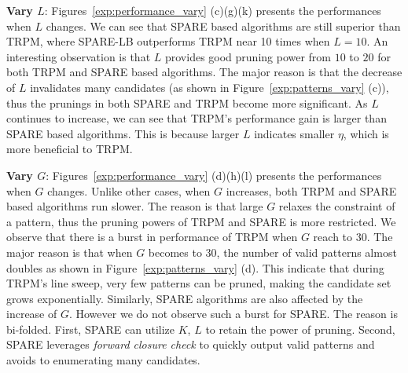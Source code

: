\textbf{Vary $L$}: Figures~\ref{exp:performance_vary} (c)(g)(k) presents the performances when $L$ changes. We can see that SPARE based algorithms are still superior than TRPM, where SPARE-LB outperforms TRPM near 10 times when $L =10$.
An interesting observation is that $L$
provides good pruning power from $10$ to $20$ for both TRPM and SPARE based algorithms. The major reason is that the decrease of $L$ invalidates many candidates (as shown in Figure~\ref{exp:patterns_vary} (c)), thus the prunings in both SPARE and TRPM become more significant.  As $L$ continues to increase, we can see that TRPM's performance gain is larger than SPARE based algorithms. This is because larger $L$ indicates smaller $\eta$, which is more beneficial to TRPM.

\textbf{Vary $G$}: Figures~\ref{exp:performance_vary} (d)(h)(l) presents the performances when $G$ changes.  Unlike other cases, when $G$ increases, both TRPM and SPARE based algorithms run slower. The reason is that large $G$ relaxes the constraint of a pattern, thus the pruning powers of TRPM and SPARE is more restricted. We observe that there is a burst in performance of TRPM when $G$ reach to $30$. The major reason is that when $G$ becomes to 30, the number of valid patterns almost doubles as shown in Figure~\ref{exp:patterns_vary} (d). This indicate that during TRPM's line sweep, very few patterns can be pruned, making the candidate set grows exponentially. Similarly, SPARE algorithms are also affected by the increase of $G$. However we do not observe such a burst for SPARE. The reason is bi-folded. First, SPARE can utilize $K$, $L$ to retain the power of pruning. Second, SPARE leverages \emph{forward closure check} to quickly output valid patterns and avoids to enumerating many candidates.
%
%
%
%






